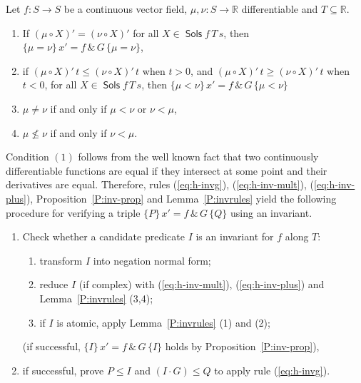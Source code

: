 \documentclass[envcountsame,envcountsect]{llncs}
\newcommand{\reals}{\mathbb{R}}
\newcommand{\Sols}{\mathop{\mathsf{Sols}}}
\begin{document}
\begin{lemma}\label{P:invrules}
  Let $f:S\to S$ be a continuous vector field, $\mu,\nu:S\to\reals$
  differentiable and $T\subseteq \reals$. 
\begin{enumerate}
\item If $(\mu\circ X)' =(\nu\circ X)'$ for all
  $X\in \Sols f\, T\, s$, then $\{\mu=\nu\}\, x' = f\, \&\, G\, \{\mu=\nu\}$, 
\item if $(\mu\circ X)'\, t\leq(\nu\circ X)'\, t$ when $t> 0$, and $(\mu\circ X)'\, t\geq(\nu\circ X)'\, t$ when $t< 0$, for all $X\in \Sols f\, T\, s$,
  then $\{\mu <\nu\}\, x' = f\, \&\, G\, \{\mu <\nu\}$
\item $\mu\neq \nu$ if and only if $\mu < \nu$ or $\nu < \mu$,
\item $\mu \not\le \nu$ if and only if $\nu < \mu$.
\end{enumerate}
\end{lemma}

Condition $(1)$ follows from the well known fact that two continuously
differentiable functions are equal if they intersect at some point and their
derivatives are equal. Therefore, rules (\ref{eq:h-invg}), (\ref{eq:h-inv-mult}), (\ref{eq:h-inv-plus}),
Proposition~\ref{P:inv-prop} and Lemma~\ref{P:invrules} yield the following procedure for verifying a triple $\{P\}\, x' = f\, \&\, G\, \{Q\}$
using an invariant.
\begin{enumerate}
\item Check whether a candidate predicate $I$ is an invariant for $f$
  along $T$:
	\begin{enumerate}
	\item transform $I$ into negation normal form;
	\item reduce $I$ (if complex) with (\ref{eq:h-inv-mult}), (\ref{eq:h-inv-plus}) and Lemma~\ref{P:invrules} (3,4);
	\item if $I$ is atomic, apply Lemma~\ref{P:invrules} (1) and (2);
	\end{enumerate}
(if successful,  $\{I\}\, x' = f\, \&\, G\, \{I\}$ holds by Proposition~\ref{P:inv-prop}),
\item if successful, prove $P\le I$ and $(I\cdot G)\le Q$ to apply rule (\ref{eq:h-invg}).
\end{enumerate}
\end{document}
